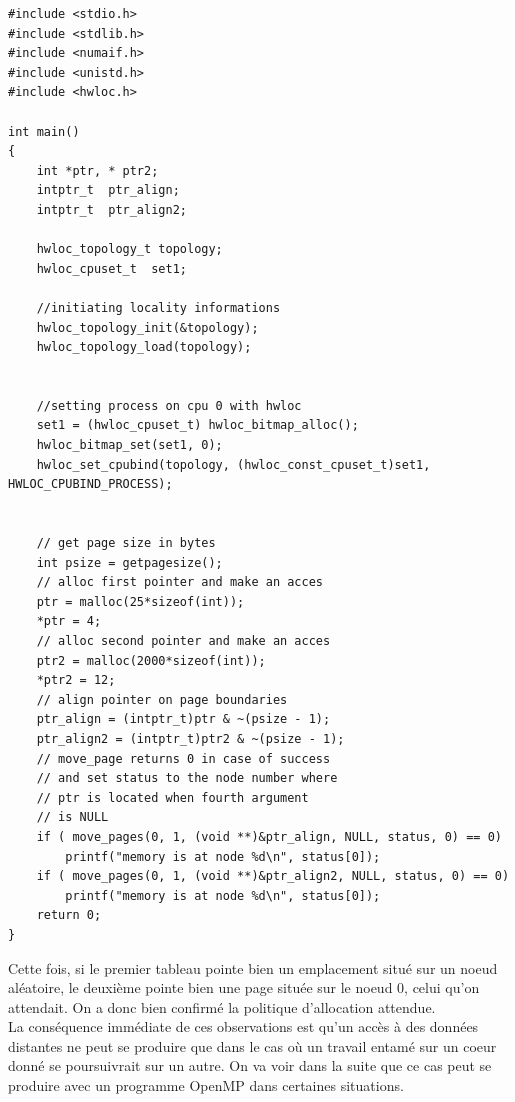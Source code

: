 \documentclass{report}
\begin{document}
\begin{lstlisting}
#include <stdio.h>
#include <stdlib.h>
#include <numaif.h>
#include <unistd.h>
#include <hwloc.h>

int main()
{
	int *ptr, * ptr2;
	intptr_t  ptr_align;
	intptr_t  ptr_align2;

	hwloc_topology_t topology;
	hwloc_cpuset_t  set1;

	//initiating locality informations
	hwloc_topology_init(&topology);
	hwloc_topology_load(topology);
	
	
	//setting process on cpu 0 with hwloc
	set1 = (hwloc_cpuset_t) hwloc_bitmap_alloc();
	hwloc_bitmap_set(set1, 0);
	hwloc_set_cpubind(topology, (hwloc_const_cpuset_t)set1, HWLOC_CPUBIND_PROCESS);


	// get page size in bytes
	int psize = getpagesize();
	// alloc first pointer and make an acces
	ptr = malloc(25*sizeof(int));
	*ptr = 4;
	// alloc second pointer and make an acces
	ptr2 = malloc(2000*sizeof(int));
	*ptr2 = 12;
	// align pointer on page boundaries
	ptr_align = (intptr_t)ptr & ~(psize - 1);
	ptr_align2 = (intptr_t)ptr2 & ~(psize - 1);
	// move_page returns 0 in case of success
	// and set status to the node number where 
	// ptr is located when fourth argument
	// is NULL
	if ( move_pages(0, 1, (void **)&ptr_align, NULL, status, 0) == 0)
		printf("memory is at node %d\n", status[0]);
	if ( move_pages(0, 1, (void **)&ptr_align2, NULL, status, 0) == 0)
		printf("memory is at node %d\n", status[0]);
	return 0;
}

\end{lstlisting}

Cette fois, si le premier tableau pointe bien un emplacement situé sur un noeud aléatoire,
le deuxième pointe bien une page située sur le noeud 0, celui qu'on attendait. On a donc
bien confirmé la politique d'allocation attendue.
\\La conséquence immédiate de ces observations est qu'un accès à des données distantes ne peut
se produire que dans le cas où un travail entamé sur un coeur donné se poursuivrait sur un autre.
On va voir dans la suite que ce cas peut se produire avec un programme OpenMP dans certaines
situations.
\end{document}
